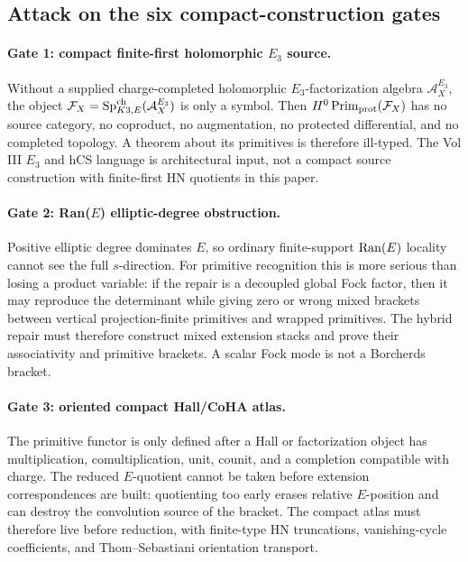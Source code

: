 \subsection{Attack on the six compact-construction gates}

\paragraph{Gate 1: compact finite-first holomorphic \(E_3\) source.}
Without a supplied charge-completed holomorphic \(E_3\)-factorization
algebra \(\mathcal A^{E_3}_X\), the object
\(\mathcal F_X=\mathrm{Sp}^{\mathrm{ch}}_{K3,E}(\mathcal A^{E_3}_X)\) is only a symbol.
Then \(H^0\operatorname{Prim}_{\mathrm{prot}}(\mathcal F_X)\) has no source category, no
coproduct, no augmentation, no protected differential, and no completed
topology.  A theorem about its primitives is therefore ill-typed.  The
Vol III \(E_3\) and hCS language is architectural input, not a compact
source construction with finite-first HN quotients in this paper.

\paragraph{Gate 2: Ran(\(E\)) elliptic-degree obstruction.}
Positive elliptic degree dominates \(E\), so ordinary finite-support
\(\operatorname{Ran}(E)\) locality cannot see the full \(s\)-direction.  For primitive
recognition this is more serious than losing a product variable: if the
repair is a decoupled global Fock factor, then it may reproduce the
determinant while giving zero or wrong mixed brackets between vertical
projection-finite primitives and wrapped primitives.  The hybrid repair
must therefore construct mixed extension stacks and prove their
associativity and primitive brackets.  A scalar Fock mode is not a
Borcherds bracket.

\paragraph{Gate 3: oriented compact Hall/CoHA atlas.}
The primitive functor is only defined after a Hall or factorization
object has multiplication, comultiplication, unit, counit, and a
completion compatible with charge.  The reduced \(E\)-quotient cannot be
taken before extension correspondences are built: quotienting too early
erases relative \(E\)-position and can destroy the convolution source of
the bracket.  The compact atlas must therefore live before reduction,
with finite-type HN truncations, vanishing-cycle coefficients, and
Thom--Sebastiani orientation transport.

